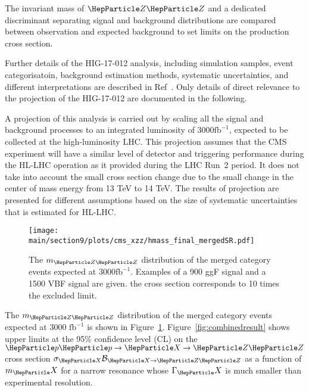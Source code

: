 The invariant mass of $\PZ \PZ$ and a dedicated discriminant separating signal and background distributions are compared between observation and expected background to set limits on the production cross section. 

Further details of the HIG-17-012 analysis, including simulation samples, event categorisatoin, background estimation methods, systematic uncertainties, and different interpretations are described in Ref~\cite{Sirunyan:2018qlb}. Only details of direct relevance to the projection of the HIG-17-012 are documented in the following.


A projection of this analysis is carried out by scaling all the signal
and background processes to an integrated luminosity of 3000$\mathrm{fb}^{-1}$, expected to be collected at the high-luminosity LHC. This projection assumes that the CMS experiment will have a similar level of detector and triggering performance during the HL-LHC operation as it provided during the LHC Run~2 period. It does not take into account the small cross section change due to the small change in the center of mass energy from 13 TeV to 14 TeV. The results of projection are presented for different assumptions based on the size of systematic uncertainties that is estimated for HL-LHC. %

\begin{figure}[htbp]
        \centering
                \texttt{[image: \\main/section9/plots/cms\_xzz/hmass\_final\_mergedSR.pdf]}
                \caption{The $m_{\PZ\PZ}$ distribution of the merged category events expected at 3000$\mathrm{fb}^{-1}$. Examples of a 900 \UGeV ggF signal and a 1500 \UGeV VBF signal are given. the cross section corresponds to 10 times the excluded limit. 
        \label{fig:mzz}
        }
            \end{figure}
The $m_{\PZ\PZ}$ distribution of the merged category events expected at 3000 $\mathrm{fb}^{-1}$ is shown in Figure~\ref{fig:mzz}. Figure~\ref{fig:combinedresult} shows upper limits at the 95\% confidence level (CL) on the $\Pp\Pp\to\PX\to\PZ\PZ$ cross section
$\sigma_{\PX} \mathcal{B}_{{\PX}\to\PZ\PZ}$ as a function of $m_\PX$ for a narrow resonance whose $\Gamma_\PX$ is much smaller than experimental resolution.

